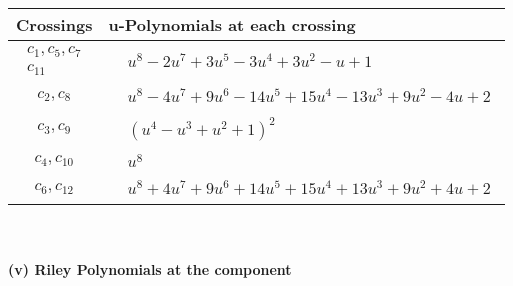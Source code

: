 \documentclass[1p]{elsarticle_modified}
\theoremstyle{definition}
\begin{document}
\begin{tabular}{m{50pt}|m{274pt}}
Crossings & \hspace{64pt}u-Polynomials at each crossing \\
\hline $$\begin{aligned}c_{1},c_{5},c_{7}\\c_{11}\end{aligned}$$&$\begin{aligned}
&u^8-2 u^7+3 u^5-3 u^4+3 u^2- u+1
\end{aligned}$\\
\hline $$\begin{aligned}c_{2},c_{8}\end{aligned}$$&$\begin{aligned}
&u^8-4 u^7+9 u^6-14 u^5+15 u^4-13 u^3+9 u^2-4 u+2
\end{aligned}$\\
\hline $$\begin{aligned}c_{3},c_{9}\end{aligned}$$&$\begin{aligned}
&(u^4- u^3+u^2+1)^2
\end{aligned}$\\
\hline $$\begin{aligned}c_{4},c_{10}\end{aligned}$$&$\begin{aligned}
&u^8
\end{aligned}$\\
\hline $$\begin{aligned}c_{6},c_{12}\end{aligned}$$&$\begin{aligned}
&u^8+4 u^7+9 u^6+14 u^5+15 u^4+13 u^3+9 u^2+4 u+2
\end{aligned}$\\
\hline
\end{tabular}\\~\\
\newpage\renewcommand{\arraystretch}{1}
\flushleft \textbf{(v) Riley Polynomials at the component}\newline \\
\end{document}
